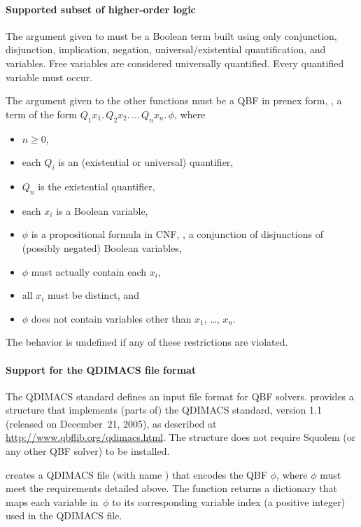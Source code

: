 \paragraph{Supported subset of higher-order logic}
The argument given to  must be a Boolean term built using only conjunction, disjunction, implication, negation, universal/existential quantification, and variables. Free variables are considered universally quantified. Every quantified variable must occur.

The argument given to the other functions must be a QBF in
prenex form, \ie, a term of the form $Q_1 x_1. \, Q_2 x_2. \, \ldots
\, Q_n x_n. \, \phi$, where
\begin{itemize}
\item $n \geq 0$,
\item each $Q_i$ is an (existential or universal) quantifier,
\item $Q_n$ is the existential quantifier,
\item each $x_i$ is a Boolean variable,
\item $\phi$ is a propositional formula in CNF, \ie, a conjunction of
  disjunctions of (possibly negated) Boolean variables,
\item $\phi$ must actually contain each $x_i$,
\item all $x_i$ must be distinct, and
\item $\phi$ does not contain variables other than $x_1$, \dots,
  $x_n$.
\end{itemize}
The behavior is undefined if any of these restrictions are violated.

\paragraph{Support for the QDIMACS file format}

The QDIMACS standard defines an input file format for QBF solvers.
 provides a structure  that implements
(parts of) the QDIMACS standard, version 1.1 (released on December~21,
2005), as described at \url{http://www.qbflib.org/qdimacs.html}.  The
 structure does not require Squolem (or any other QBF
solver) to be installed.

 creates a QDIMACS file
(with name ) that encodes the QBF $\phi$, where $\phi$ must
meet the requirements detailed above.  The function returns a
dictionary that maps each variable in~$\phi$ to its corresponding
variable index (a positive integer) used in the QDIMACS file.

